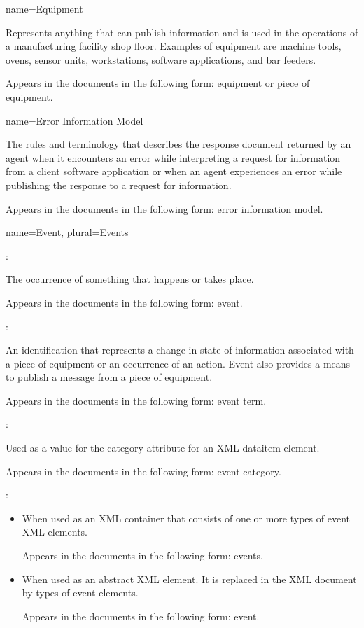 {
  name={Equipment}
}
{
	Represents anything that can publish information and is used in the operations of a manufacturing facility shop floor.  Examples of equipment are machine tools, ovens, sensor units, workstations, software applications, and bar feeders.

	Appears in the documents in the following form: equipment or piece of equipment.
}


{
  name={Error Information Model}
}
{
	The rules and terminology that describes the \gls{response document} returned by an \gls{agent} when it encounters an error while interpreting a \gls{request} for information from a client software application or when an \gls{agent} experiences an error while publishing the \gls{response} to a \gls{request} for information.

	Appears in the documents in the following form: \gls{error information model}.
}


{
  name={Event},
  plural={Events}
}
{
	:

	The occurrence of something that happens or takes place.

	Appears in the documents in the following form: event.

	:

	An identification that represents a change in state of information associated with a piece of equipment or an occurrence of an action.  Event also provides a means to publish a message from a piece of equipment.

	Appears in the documents in the following form: \gls{event term}.

	:

	Used as a value for the \gls{category} attribute for an XML \gls{dataitem} element.

	Appears in the documents in the following form: \gls{event category}.

	:

    \begin{itemize}
	\item When used as an XML container that consists of one or more types of \gls{event} XML elements.

	Appears in the documents in the following form: \gls{events}.

	\item When used as an abstract XML element.  It is replaced in the XML document by types of \gls{event} elements.

	Appears in the documents in the following form: \gls{event}.
    \end{itemize}
}


